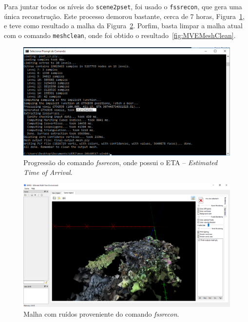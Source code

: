 Para juntar todos os níveis do \texttt{scene2pset}, foi usado o \texttt{fssrecon},
que gera uma única reconstrução. Este processo demorou bastante, cerca de 7
horas, Figura~\ref{fig:MVEFSSR}, e teve como resultado a malha da Figura~\ref{fig:MVEFSSRMesh}.
Porfim, basta limpar a malha atual com o comando \texttt{meshclean}, onde foi
obtido o resultado~\ref{fig:MVEMeshClean}.

\begin{figure}[!h]
	\centering
	\includegraphics[width=0.8\linewidth]{figs/mvemeshtempo2.png}
	\caption{%
	Progressão do comando \emph{fssrecon}, onde possui o ETA -- \emph{Estimated Time of Arrival}.
	}\label{fig:MVEFSSR}
\end{figure} 

\begin{figure}[!h]
	\centering
	\includegraphics[width=1\linewidth]{figs/mvemeshout.png}
	\caption{%
	Malha com ruídos proveniente do comando \emph{fssrecon}.
	}\label{fig:MVEFSSRMesh}
\end{figure} 

